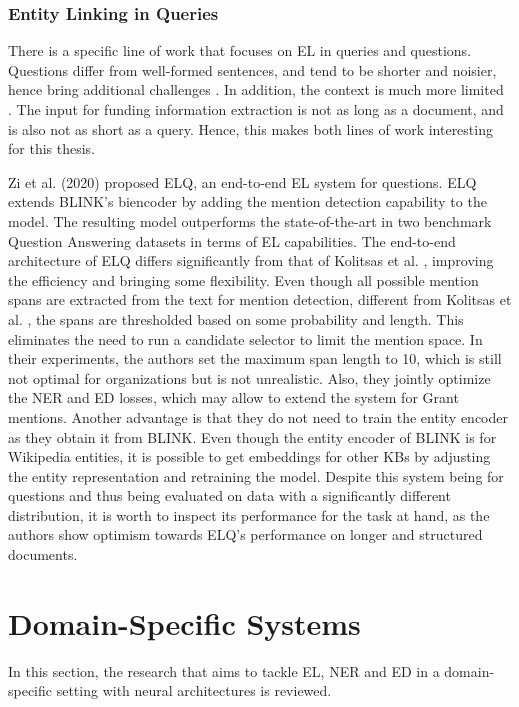 \documentclass{report}
\theoremstyle{definition}
\theoremstyle{remark}
\begin{document}
\subsubsection{Entity Linking in Queries}
There is a specific line of work that focuses on EL in queries and questions. Questions differ from well-formed sentences, and tend to be shorter and noisier, hence bring additional challenges \cite{elq}. In addition, the context is much more limited \cite{ELinConv}. The input for funding information extraction is not as long as a document, and is also not as short as a query. Hence, this makes both lines of work interesting for this thesis.

Zi et al. (2020) \cite{elq} proposed ELQ, an end-to-end EL system for questions. ELQ extends BLINK's biencoder by adding the mention detection capability to the model. The resulting model outperforms the state-of-the-art in two benchmark Question Answering datasets in terms of EL capabilities. The end-to-end architecture of ELQ differs significantly from that of Kolitsas et al. \cite{kolitsas}, improving the efficiency and bringing some flexibility. Even though all possible mention spans are extracted from the text for mention detection, different from Kolitsas et al. \cite{kolitsas}, the spans are thresholded based on some probability and length. This eliminates the need to run a candidate selector to limit the mention space. In their experiments, the authors set the maximum span length to 10, which is still not optimal for organizations but is not unrealistic. Also, they jointly optimize the NER and ED losses, which may allow to extend the system for Grant mentions. Another advantage is that they do not need to train the entity encoder as they obtain it from BLINK. Even though the entity encoder of BLINK is for Wikipedia entities, it is possible to get embeddings for other KBs by adjusting the entity representation and retraining the model. Despite this system being for questions and thus being evaluated on data with a significantly different distribution, it is worth to inspect its performance for the task at hand, as the authors show optimism towards ELQ's performance on longer and structured documents.

\section{Domain-Specific Systems}
\label{domSpec}
In this section, the research that aims to tackle EL, NER and ED in a domain-specific setting with neural architectures is reviewed.
\end{document}
